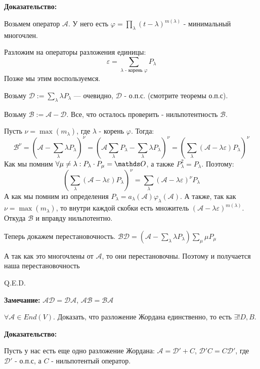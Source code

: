 \textbf{Доказательство:}

Возьмем оператор $\mathcal{A}$. У него есть $\varphi = \prod\limits_{\lambda}(t-\lambda)^{m(\lambda)}$ - минимальный многочлен. 

Разложим на операторы разложения единицы:
$$\varepsilon = \sum\limits_{\lambda\text{ -  корень $\varphi$}}P_{\lambda}$$
Позже мы этим воспользуемся.

Возьму $\mathcal{D}:= \sum\limits_{\lambda}\lambda P_{\lambda}$ --- очевидно, $\mathcal{D}$ - о.п.с. (смотрите теоремы о.п.с).

Возьму $\mathcal{B}:= \mathcal{A}-\mathcal{D}$. Все, что осталось проверить - нильпотентность $\mathcal{B}$.

Пусть $\nu = \max (m_{\lambda})$, где $\lambda$ - корень $\varphi$. Тогда:
$$\mathcal{B}^{\nu} = \left(\mathcal{A}-\sum\limits_{\lambda}\lambda P_\lambda\right)^\nu = \left(\mathcal{A}\sum\limits_{\lambda}P_{\lambda }- \sum\limits_{\lambda}\lambda P_{\lambda}\right)^\nu = \left(\sum\limits_{\lambda}\left(\mathcal{A-\lambda\varepsilon}\right)P_{\lambda}\right)^\nu$$
Как мы помним $\forall \mu\neq \lambda:P_\lambda\cdot P_{\mu}=\zero$, а также $P_{\lambda}^2=P_\lambda$. Поэтому:
$$\left(\sum\limits_{\lambda}\left(\mathcal{A}-\lambda\varepsilon\right)P_{\lambda}\right)^\nu = \sum\limits_{\lambda}\left(\mathcal{A}-\lambda\varepsilon\right)^\nu P_\lambda$$
А как мы помним из определения $P_\lambda = a_\lambda(\mathcal{A})\varphi_\lambda(\mathcal{A})$. А также, так как $\nu = \max(m_\lambda)$, то внутри каждой скобки есть множитель $(\mathcal{A}-\lambda\varepsilon)^{m(\lambda)}$. Откуда $\mathcal{B}$ и вправду нильпотентно.

Теперь докажем перестановочность.
$\mathcal{B}\mathcal{D} = \left(\mathcal{A}-\sum\limits_{\lambda}\lambda P_\lambda\right)\sum\limits_{\mu}\mu P_{\mu}$

А так как это многочлены от $\mathcal{A}$, то они перестановочны.  Поэтому и получается наша перестановочность

 \hfill Q.E.D.
 
\textbf{Замечание:} $\mathcal{A}\mathcal{D} = \mathcal{D} \mathcal{A}$, $\mathcal{A}\mathcal{B} = \mathcal{B} \mathcal{A}$


$\forall \mathcal{A} \in End(V)$. Доказать, что разложение Жордана единственно, то есть $\exists! D, B$.

\textbf{Доказательство:}

Пусть у нас есть еще одно разложение Жордана: $\mathcal{A} = \mathcal{D}'  + C$, $\mathcal{D}'C=C\mathcal{D}'$, где $\mathcal{D}'$ - о.п.с, а $C$ - нильпотентый оператор.

